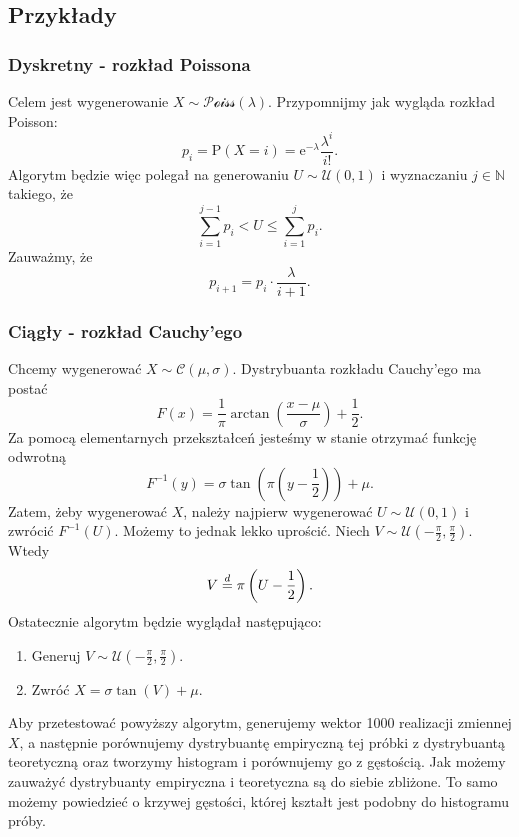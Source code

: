 \documentclass[12pt]{mwrep}
\begin{document}
	\subsection{Przykłady}
	
	\subsubsection{Dyskretny - rozkład Poissona}
	\noindent Celem jest wygenerowanie $X \sim \mathcal{Poiss}(\lambda)$. Przypomnijmy jak wygląda rozkład Poisson:
	$$ p_i = \mathrm{P}(X = i) = \mathrm{e}^{-\lambda} \frac{\lambda^i}{i!}. $$
	Algorytm będzie więc polegał na generowaniu $U \sim \mathcal{U}(0, 1)$ i wyznaczaniu $j \in \mathbb{N} $ takiego, że 
	$$ \sum\limits_{i=1}^{j-1} p_i < U \leqslant \sum\limits_{i=1}^{j} p_i. $$
	Zauważmy, że
	$$ p_{i + 1} = p_i \cdot \frac{\lambda}{i + 1}. $$
	
	\subsubsection{Ciągły - rozkład Cauchy'ego}
	\noindent Chcemy wygenerować $ X \sim \mathcal{C}(\mu, \sigma) $. 
	Dystrybuanta rozkładu Cauchy'ego ma postać
	$$ F(x) = \frac{1}{\pi} \arctan{\left(\frac{x - \mu}{\sigma}\right)} + \frac{1}{2}. $$
	Za pomocą elementarnych przekształceń jesteśmy w stanie otrzymać funkcję odwrotną
	$$ F^{-1}(y) = \sigma \tan \left(\pi \left(y - \frac{1}{2}\right) \right) + \mu. $$
	Zatem, żeby wygenerować $X$, należy najpierw wygenerować $U \sim \mathcal{U}(0, 1) $ i zwrócić $F^{-1}(U)$. Możemy to jednak lekko uprościć. Niech $ V \sim \mathcal{U}\left(-\frac{\pi}{2}, \frac{\pi}{2}\right) $. Wtedy
	$$ V \buildrel{d}\over{=} \pi \left(U - \frac{1}{2}\right). $$
	Ostatecznie algorytm będzie wyglądał następująco:
	\begin{enumerate}[leftmargin=10mm]
		\item Generuj $V \sim \mathcal{U}\left(-\frac{\pi}{2}, \frac{\pi}{2}\right)$.
		\item Zwróć $ X = \sigma \tan(V) + \mu $.
	\end{enumerate}
	Aby przetestować powyższy algorytm, generujemy wektor 1000 realizacji zmiennej $X$, a następnie porównujemy dystrybuantę empiryczną tej próbki z dystrybuantą teoretyczną oraz tworzymy histogram i porównujemy go z gęstością.
	Jak możemy zauważyć dystrybuanty empiryczna i teoretyczna są do siebie zbliżone. To samo możemy powiedzieć o krzywej gęstości, której kształt jest podobny do histogramu próby.
\end{document}
